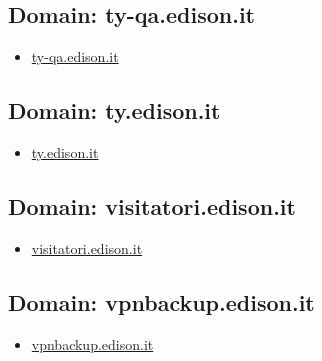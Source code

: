 \documentclass{article}
\begin{document}
    \subsection{Domain: ty-qa.edison.it}
    \begin{itemize}
        
            
                
                \item \href{ https://ty-qa.edison.it/}{ ty-qa.edison.it }
            
        
    \end{itemize}

    \subsection{Domain: ty.edison.it}
    \begin{itemize}
        
            
                
                \item \href{ https://ty.edison.it/}{ ty.edison.it }
            
        
    \end{itemize}

    \subsection{Domain: visitatori.edison.it}
    \begin{itemize}
        
            
                
                \item \href{ https://visitatori.edison.it/}{ visitatori.edison.it }
            
        
    \end{itemize}

    \subsection{Domain: vpnbackup.edison.it}
    \begin{itemize}
        
            
                
                \item \href{ http://vpnbackup.edison.it/}{ vpnbackup.edison.it }
            
        
    \end{itemize}
\end{document}
